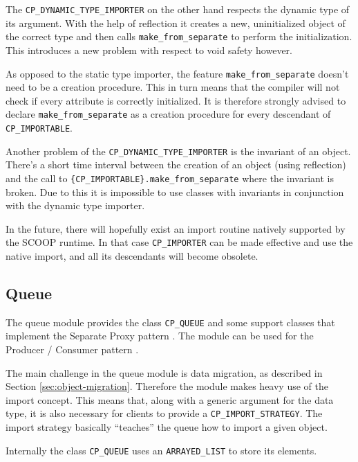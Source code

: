 The \lstinline!CP_DYNAMIC_TYPE_IMPORTER! on the other hand respects the dynamic type of its argument.
With the help of reflection it creates a new, uninitialized object of the correct type and then calls \lstinline!make_from_separate! to perform the initialization.
This introduces a new problem with respect to void safety however.

As opposed to the static type importer, the feature \lstinline!make_from_separate! doesn't need to be a creation procedure.
This in turn means that the compiler will not check if every attribute is correctly initialized.
It is therefore strongly advised to declare \lstinline!make_from_separate! as a creation procedure for every descendant of \lstinline!CP_IMPORTABLE!.

Another problem of the \lstinline!CP_DYNAMIC_TYPE_IMPORTER! is the invariant of an object.
There's a short time interval between the creation of an object (using reflection) and the call to \lstinline!{CP_IMPORTABLE}.make_from_separate! where the invariant is broken.
Due to this it is impossible to use classes with invariants in conjunction with the dynamic type importer.

In the future, there will hopefully exist an import routine natively supported by the SCOOP runtime.
In that case \lstinline!CP_IMPORTER! can be made effective and use the native import, and all its descendants will become obsolete.

\subsection{Queue}

The queue module provides the class \lstinline!CP_QUEUE! and some support classes that implement the Separate Proxy pattern .
The module can be used for the Producer / Consumer pattern .

The main challenge in the queue module is data migration, as described in Section \ref{sec:object-migration}.
Therefore the module makes heavy use of the import concept.
This means that, along with a generic argument for the data type, it is also necessary for clients to provide a \lstinline!CP_IMPORT_STRATEGY!.
The import strategy basically ``teaches'' the queue how to import a given object.

Internally the class \lstinline!CP_QUEUE! uses an \lstinline!ARRAYED_LIST! to store its elements.

